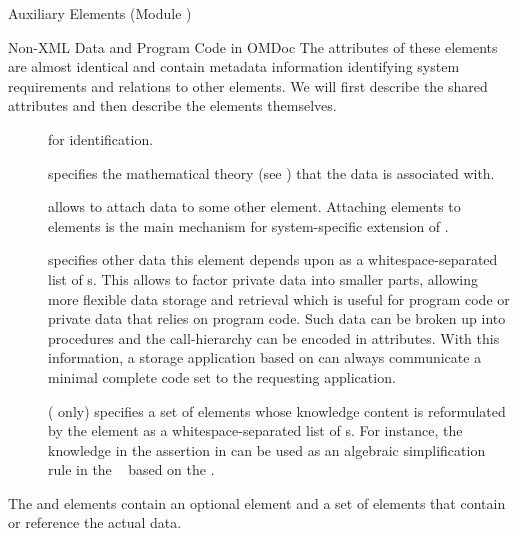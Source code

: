 \begin{tchapter}[id=ext,short=Auxiliary Elements]{Auxiliary Elements (Module {})}
\begin{tsection}[id=private]{Non-XML Data and Program Code in OMDoc}
  The attributes of these elements are almost identical and contain metadata
  information identifying system requirements and relations to other {\omdoc}
  elements. We will first describe the shared attributes and then describe the
  elements themselves.
\begin{description}
\item[{}] for identification.
\item[{}] specifies the mathematical theory (see
  {}) that the data is associated with.
\item[{}] allows to attach data to some other {\omdoc}
  element. Attaching {} elements to {\omdoc} elements is the main
  mechanism for system-specific extension of {\omdoc}.
\item[{}] specifies other data this element depends
  upon as a whitespace-separated list of {s}.  This allows to
  factor private data into smaller parts, allowing more flexible data storage and
  retrieval which is useful for program code or private data that relies on program
  code. Such data can be broken up into procedures and the call-hierarchy can be encoded
  in {} attributes. With this information, a storage
  application based on {\omdoc} can always communicate a minimal complete code set to the
  requesting application.
\item[{}] ({} only) specifies a set of
  {\omdoc} elements whose knowledge content is reformulated by the {}
  element as a whitespace-separated list of {s}. For instance, the
  knowledge in the assertion in {} can be used as an algebraic
  simplification rule in the {}
  {}~\cite{ClaKoh:sda03} based on the {}
  {}.
\end{description}

The {} and {} elements contain an optional
{} element and a set of {} elements that contain
or reference the actual data.


\end{tsection}
\end{tchapter}

